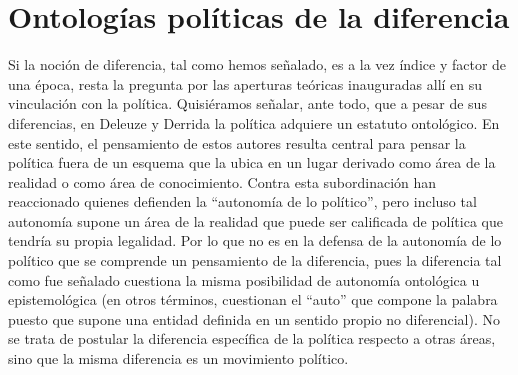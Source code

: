 \section{Ontologías políticas de la diferencia}

Si la noción de diferencia, tal como hemos señalado, es a la vez índice
y factor de una época, resta la pregunta por las aperturas teóricas
inauguradas allí en su vinculación con la política. Quisiéramos señalar,
ante todo, que a pesar de sus diferencias, en Deleuze y Derrida la
política adquiere un estatuto ontológico. En este sentido, el
pensamiento de estos autores resulta central para pensar la política
fuera de un esquema que la ubica en un lugar derivado como área de la
realidad o como área de conocimiento. Contra esta subordinación han
reaccionado quienes defienden la \enquote{autonomía de lo político}, pero
incluso tal autonomía supone un área de la realidad que puede ser
calificada de política que tendría su propia legalidad. Por lo que no es
en la defensa de la autonomía de lo político que se comprende un
pensamiento de la diferencia, pues la diferencia tal como fue señalado
cuestiona la misma posibilidad de autonomía ontológica u epistemológica
(en otros términos, cuestionan el \enquote{auto} que compone la palabra puesto
que supone una entidad definida en un sentido propio no diferencial). No
se trata de postular la diferencia específica de la política respecto a
otras áreas, sino que la misma diferencia es un movimiento político.

